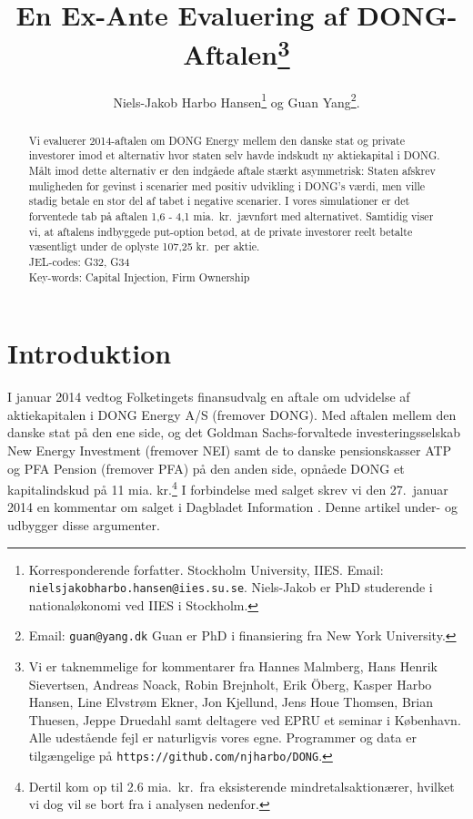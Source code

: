 \documentclass{article}
\title{En Ex-Ante Evaluering af DONG-Aftalen\thanks{Vi er taknemmelige for kommentarer fra Hannes Malmberg, Hans Henrik Sievertsen, Andreas Noack, Robin Brejnholt, Erik {\"O}berg, Kasper Harbo Hansen, Line Elvstrøm Ekner, Jon Kjellund,  Jens Houe Thomsen, Brian Thuesen, Jeppe Druedahl samt deltagere ved EPRU et seminar i København. Alle udestående fejl er naturligvis vores egne.  Programmer og data er tilgængelige på \texttt{https://github.com/njharbo/DONG}.} \\ }
\author{Niels-Jakob Harbo Hansen\thanks{Korresponderende forfatter. Stockholm University, IIES.  Email: \texttt{nielsjakobharbo.hansen@iies.su.se}. Niels-Jakob er PhD studerende i nationaløkonomi ved IIES i Stockholm.} \hspace{0.1 mm} og Guan Yang\thanks{Email: \texttt{guan@yang.dk} Guan er PhD i finansiering fra New York University.  }. }
\begin{document}
\maketitle

\begin{abstract}
\onehalfspacing
Vi evaluerer 2014-aftalen om DONG Energy mellem den danske stat og private investorer imod et alternativ hvor staten selv havde indskudt ny aktiekapital i DONG. Målt imod dette alternativ er den indgåede aftale stærkt asymmetrisk: Staten afskrev muligheden for gevinst i scenarier med positiv udvikling i DONG's værdi, men ville stadig betale en stor del af tabet i negative scenarier. I vores simulationer er det forventede tab på aftalen 1,6 - 4,1 mia.\ kr.\ jævnført med alternativet. Samtidig viser vi, at aftalens indbyggede put-option betød, at de private investorer reelt betalte væsentligt under de oplyste 107,25 kr.\ per aktie. \\
 JEL-codes: G32, G34 \\
 Key-words: Capital Injection, Firm Ownership
\end{abstract}


\newpage

\section{Introduktion}


I januar 2014 vedtog Folketingets finansudvalg en aftale om udvidelse af aktiekapitalen i DONG Energy A/S (fremover DONG). Med aftalen mellem den danske stat på den ene side, og det Goldman Sachs-forvaltede investeringsselskab New Energy Investment (fremover NEI) samt de to danske pensionskasser ATP og PFA Pension (fremover PFA) på den anden side, opnåede DONG et kapitalindskud på 11 mia. kr.\footnote{Dertil kom op til 2.6 mia.\ kr.\ fra eksisterende mindretalsaktionærer, hvilket vi dog vil se bort fra i analysen nedenfor.} I forbindelse med salget skrev vi den 27.\ januar 2014 en kommentar om salget i Dagbladet Information \citep{Hansen2014}. Denne artikel under- og udbygger  disse argumenter.
\end{document}
